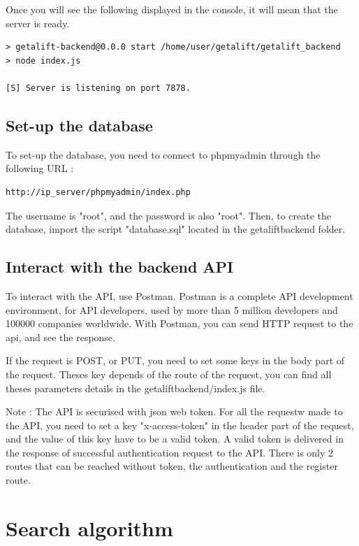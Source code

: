 Once you will see the following displayed in the console, it will mean that the server is ready.

\begin{lstlisting}[style=DOS]
> getalift-backend@0.0.0 start /home/user/getalift/getalift_backend
> node index.js

[S] Server is listening on port 7878.
\end{lstlisting}

\subsection{Set-up the database}
To set-up the database, you need to connect to phpmyadmin through the following URL :

\begin{lstlisting}[style=DOS]
http://ip_server/phpmyadmin/index.php
\end{lstlisting}

The username is "root", and the password is also "root". Then, to create the database, import the script "database.sql" located in the getalift\textunderscore backend folder.

\subsection{Interact with the backend API}

To interact with the API, use Postman. Postman is a complete API development environment, for API developers, used by more than 5 million developers and 100000 companies worldwide. With Postman, you can send HTTP request to the api, and see the response.

If the request is POST, or PUT, you need to set some keys in the body part of the request. Theses key depends of the route of the request, you can find all theses parameters details in the getalift\textunderscore backend/index.js file.

Note : The API is securised with json web token. For all the requestw made to the API, you need to set a key "x-access-token" in the header part of the request, and the value of this key have to be a valid token. A valid token is delivered in the response of successful authentication request to the API. There is only 2 routes that can be reached without token, the authentication and the register route.

\section{Search algorithm}


